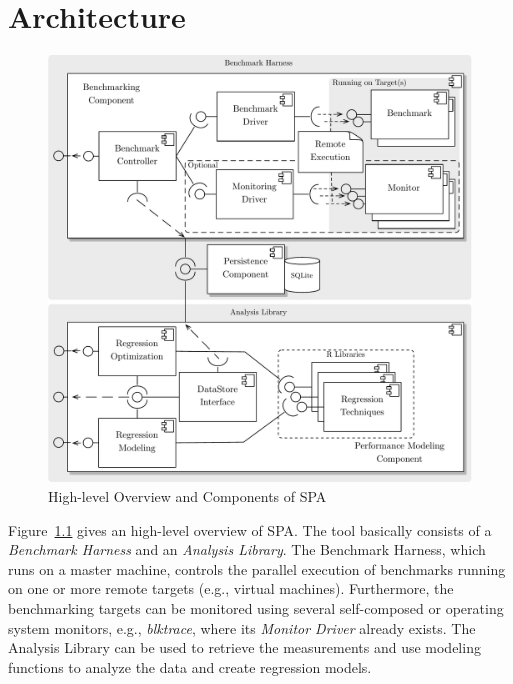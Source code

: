 \chapter{Architecture}

\begin{figure}[htbp]
	\centering
	\includegraphics[scale=0.55]{graphics/Components.pdf}
	\caption{High-level Overview and Components of SPA}
 	\label{fig:ComponentDesign}
\end{figure}

Figure~\ref{fig:ComponentDesign} gives an high-level overview of SPA. The tool basically consists of a \textit{Benchmark Harness} and an \textit{Analysis Library}. The Benchmark Harness, which runs on a master machine, controls the parallel execution of benchmarks running on one or more remote targets (e.g., virtual machines). Furthermore, the benchmarking targets can be monitored using several self-composed or operating system monitors, e.g., \textit{blktrace}, where its \textit{Monitor Driver} already exists. The Analysis Library can be used to retrieve the measurements and use modeling functions to analyze the data and create regression models. 

